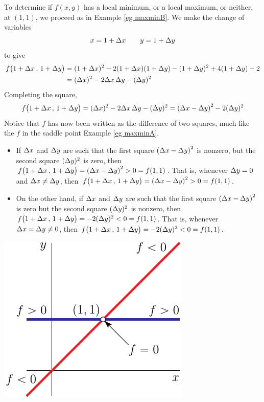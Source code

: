 \begin{eg}[$f(x,y)= x^2-2xy-y^2+4y-2$]
To determine if $f(x,y)$ has a local minimum, or a local maximum,
or neither, at $(1,1)$, we proceed as in Example \ref{eg maxminB}.
We make the change of variables
\begin{equation*}
x=1+\Delta x\qquad
y=1+\Delta y
\end{equation*} 
to give
\begin{align*}
f\big(1+\Delta x\,,\,1+\Delta y\big)
&=(1+\Delta x)^2-2(1+\Delta x)(1+\Delta y)-(1+\Delta y)^2 + 4(1+\Delta y)-2 \\
&= (\Delta x)^2 -2\Delta x\,\Delta y-(\Delta y)^2 
\end{align*}
Completing the square,
\begin{equation*}
f\big(1+\Delta x\,,\,1+\Delta y\big)
=(\Delta x)^2 -2\Delta x\,\Delta y-(\Delta y)^2
=\left(\Delta x - \Delta y\right)^2  -2 (\Delta y)^2
\end{equation*}
Notice that $f$ has now been written as the difference of two squares, 
much like the $f$ in the saddle point Example \ref{eg maxminA}.
\begin{itemize}
\item
If $\Delta x$ and $\Delta y$ are such that the first square 
$\left(\Delta x - \Delta y\right)^2$ is nonzero, but the second square  $(\Delta y)^2$
is zero, then 
$f\big(1+\Delta x\,,\,1+\Delta y\big)=\left(\Delta x - \Delta y\right)^2  > 0 = f(1,1)$.
That is, whenever $\Delta y=0$ and $\Delta x\ne \Delta y$, then
$f\big(1+\Delta x\,,\,1+\Delta y\big)=\left(\Delta x - \Delta y\right)^2  > 0 = f(1,1)$. 
\item
On the other hand, if $\Delta x$ and $\Delta y$ are such that the first square 
$\left(\Delta x - \Delta y\right)^2$ is zero but the second square  $(\Delta y)^2$
is nonzero, then 
$f\big(1+\Delta x\,,\,1+\Delta y\big)=- 2(\Delta y)^2   < 0 = f(1,1)$.
That is, whenever $\Delta x=\Delta y\ne 0$,  then
$f\big(1+\Delta x\,,\,1+\Delta y\big) =- 2(\Delta y)^2 < 0 = f(1,1)$.
\end{itemize}
\begin{efig}
\begin{center}
   \includegraphics{saddle.pdf}

\end{center}
\end{efig}
\end{eg}
